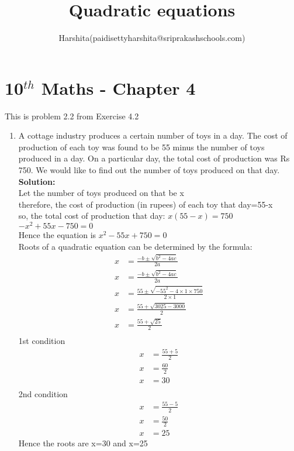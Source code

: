 \documentclass[12pt]{article}
\title{Quadratic equations}
\author{Harshita(paidisettyharshita@sriprakashschools.com)}
\newcommand{\solution}{\noindent \textbf{Solution: }}
\begin{document}
\maketitle
\section*{10$^{th}$ Maths - Chapter 4}
This is problem 2.2 from Exercise 4.2
\begin{enumerate}
\item  A cottage industry produces a certain number of toys in a day. The cost of production of each  toy was found to be 55 minus the number of toys produced in a day. On a particular day, the total cost of production was Rs 750. We would like to find out the number of toys produced on that day.\\
 
\solution\\
Let the number of toys produced on that be x\\
therefore, the cost of production (in rupees) of each toy that day=55-x\\
so, the total cost of production that day: $x(55-x)=750$\\
\implies $-x^2+55x-750=0$\\
 Hence the equation is
 ${x^2-55x+750=0}$\\

Roots of a quadratic equation can be determined by the formula:
\begin{align}
x &=\frac{-b\pm\sqrt{b^2-4ac}}{2a}\\
x &=\frac{-b\pm\sqrt{b^2-4ac}}{2a}\\
x &=\frac{55\pm\sqrt{-55^2-4 \times 1\times750}}{2 \times 1}\\
x &=\frac{55+\sqrt{3025-3000}}{2}\\
x &=\frac{55+\sqrt{25}}{2}\\
\end{align}
1st condition\\
\begin{align}
x &=\frac{55+5}{2}\\
x &=\frac{60}{2}\\
x &=30\\
\end{align}
2nd condition\\
\begin{align}
x &=\frac{55-5}{2}\\
x &=\frac{50}{2}\\
x &=25
\end{align}
Hence the roots are x=30 and x=25
\end{enumerate}
\end{document}
